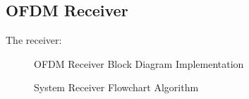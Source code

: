 \subsection{OFDM Receiver}
The receiver:
\begin{figure}[htpb!]
	\centerline{\resizebox{15cm}{!}{}}
	\caption{OFDM Receiver Block Diagram Implementation}
	\label{fig:ofdm_r_meth}
\end{figure}
\begin{figure}[htpb!]
	\centerline{}
	\caption{System Receiver Flowchart Algorithm}
	\label{fig:ofdm_receiver_meth}
\end{figure}


\pagebreak

